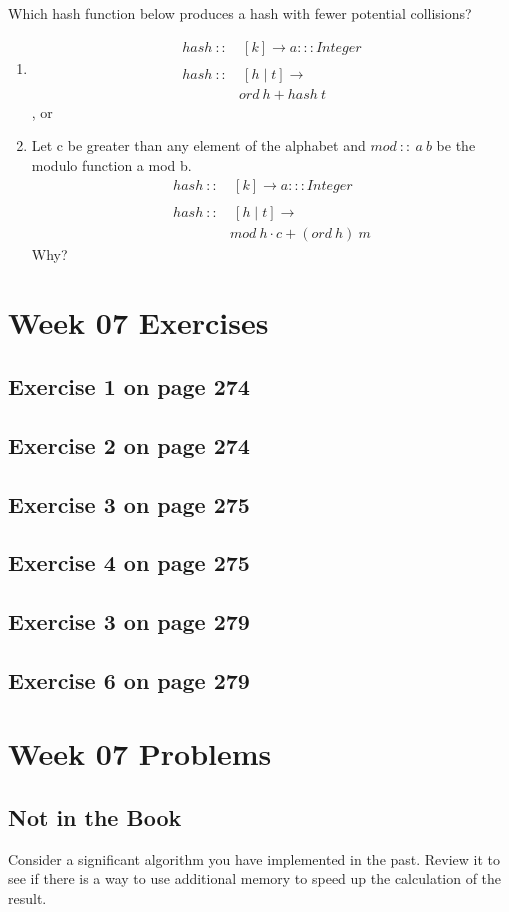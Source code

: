 \documentclass[12pt]{amsart}
\begin{document}
Which hash function below produces a hash with fewer potential collisions?
\begin{enumerate}
	\item \begin{align*} 
		  hash\ ::&\ [k]\rightarrow a:::Integer\\
		  \\
		  hash\ ::&\ [h\mid t]\rightarrow\\
		  	& ord\ h +hash\ t\end{align*}, or
	\item  Let c be greater than any element of the alphabet and $mod\ ::\ a\ b$ be the modulo function a mod b.
	\begin{align*}
		hash\ ::&\ [k]\rightarrow a:::Integer\\
		  \\
		  hash\ ::&\ [h\mid t]\rightarrow\\
		  	&mod\ h\cdot c+ (ord\ h)\ m
	\end{align*}
	Why?
\end{enumerate}



 \section{Week 07 Exercises}
\subsection{ Exercise 1 on page 274} 
\subsection{ Exercise 2 on page 274} 
\subsection{Exercise 3 on page 275} 
\subsection{Exercise 4 on page 275} 
\subsection{Exercise 3 on page 279} 
\subsection{Exercise 6 on page 279}


\section{Week 07 Problems}
\subsection{Not in the Book}
Consider a significant algorithm you have implemented in the past. Review it to see if there is a way to use additional memory to speed up the calculation of the result.
\end{document}
